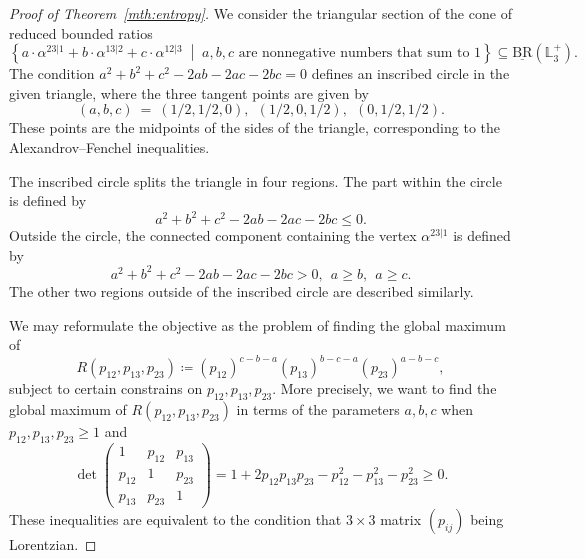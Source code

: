 \documentclass{amsart}
\theoremstyle{definition}
\theoremstyle{remark}
\def\L{\mathbb{L}}
\def\BR{\mathrm{BR}}
\begin{document}
\begin{proof}[Proof of Theorem~\ref{mth:entropy}]
We consider the triangular section of the cone of reduced bounded ratios 
\[
\left\{a \cdot \alpha^{23|1}+b \cdot \alpha^{13|2}+c \cdot \alpha^{12|3}  \;\middle|\;  \text{$a,b,c$ are nonnegative numbers that sum to $1$}\right\} \subseteq \underline{\BR}(\L_3^+).
\]
The condition $a^2+b^2+c^2-2ab-2ac-2bc=0$ defines an inscribed circle in the given triangle, where the three tangent points are given by
\[
(a,b,c) \ = \ (1/2,1/2,0), \ \ (1/2,0,1/2), \ \ (0,1/2,1/2).
\]
These points are the midpoints of the sides of the triangle, corresponding to the Alexandrov--Fenchel inequalities. 

The inscribed circle splits the triangle in four regions. The part within the circle is defined by 
\[
a^2+b^2+c^2-2ab-2ac-2bc\leq 0.
\]
Outside the circle, the connected component containing the vertex $\alpha^{23|1}$ is defined by
\[
a^2+b^2+c^2-2ab-2ac-2bc > 0,  \ \ a \ge b, \ \ a \ge c.
\]
The other two regions outside of the inscribed circle are described similarly. 

We may reformulate the objective as the problem of   finding the global maximum of 
\[
R(p_{12},p_{13},p_{23})\coloneqq(p_{12})^{c-b-a}(p_{13})^{b-c-a}(p_{23})^{a-b-c},
\]
subject to certain constrains on $p_{12},p_{13},p_{23}$. More precisely, we want to find the global maximum of $R(p_{12},p_{13},p_{23})$ in terms of the parameters $a,b,c$  when $p_{12},p_{13},p_{23}\geq 1$ and
\[
\det\begin{pmatrix}
	1 & p_{12} & p_{13} \\
	p_{12} & 1      & p_{23} \\
	p_{13} & p_{23} & 1
\end{pmatrix}= 
1+2p_{12}p_{13}p_{23}-p^2_{12}-p^2_{13}-p^2_{23}\geq 0.
\]
These inequalities are equivalent to the condition that  $3 \times 3$ matrix $(p_{ij})$ being Lorentzian.


\end{proof}
\end{document}
